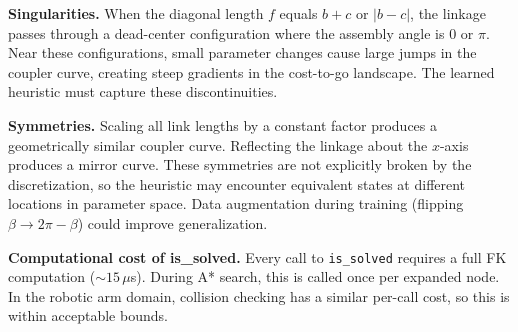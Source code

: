 \documentclass[11pt]{article}
\begin{document}
\textbf{Singularities.} When the diagonal length $f$ equals $b + c$ or $|b - c|$, the linkage passes through a dead-center configuration where the assembly angle is $0$ or $\pi$. Near these configurations, small parameter changes cause large jumps in the coupler curve, creating steep gradients in the cost-to-go landscape. The learned heuristic must capture these discontinuities.

\textbf{Symmetries.} Scaling all link lengths by a constant factor produces a geometrically similar coupler curve. Reflecting the linkage about the $x$-axis produces a mirror curve. These symmetries are not explicitly broken by the discretization, so the heuristic may encounter equivalent states at different locations in parameter space. Data augmentation during training (flipping $\beta \to 2\pi - \beta$) could improve generalization.

\textbf{Computational cost of is\_solved.} Every call to \texttt{is\_solved} requires a full FK computation ($\sim 15\,\mu$s). During A* search, this is called once per expanded node. In the robotic arm domain, collision checking has a similar per-call cost, so this is within acceptable bounds.
\end{document}
